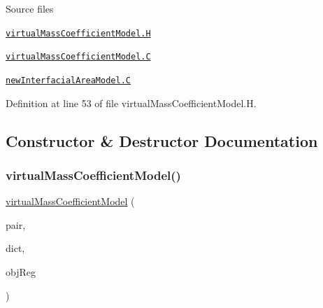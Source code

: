 \begin{DoxyParagraph}{Source files}

\begin{DoxyItemize}
\item \href{../../../home/carlo/data/GeN-Foam/GeN-Foam_ffn/GeN-Foam/GeN-Foam/classes/thermalHydraulics/src/physicsModels/virtualMassModels/virtualMassCoefficientModels/virtualMassCoefficientModel.H}{\tt virtual\+Mass\+Coefficient\+Model.\+H} 
\item \href{../../../home/carlo/data/GeN-Foam/GeN-Foam_ffn/GeN-Foam/GeN-Foam/classes/thermalHydraulics/src/physicsModels/virtualMassModels/virtualMassCoefficientModels/virtualMassCoefficientModel.C}{\tt virtual\+Mass\+Coefficient\+Model.\+C} 
\item \href{../../../home/carlo/data/GeN-Foam/GeN-Foam_ffn/GeN-Foam/GeN-Foam/classes/thermalHydraulics/src/physicsModels/virtualMassModels/virtualMassCoefficientModels/newInterfacialAreaModel.C}{\tt new\+Interfacial\+Area\+Model.\+C} 
\end{DoxyItemize}
\end{DoxyParagraph}


Definition at line 53 of file virtual\+Mass\+Coefficient\+Model.\+H.



\subsection{Constructor \& Destructor Documentation}
\mbox{\label{classFoam_1_1virtualMassCoefficientModel_a9cba82ef48369643a0bec036b6adfaec}} 
\subsubsection{\texorpdfstring{virtual\+Mass\+Coefficient\+Model()}{virtualMassCoefficientModel()}}
{\footnotesize\ttfamily \hyperlink{classFoam_1_1virtualMassCoefficientModel}{virtual\+Mass\+Coefficient\+Model} (\begin{DoxyParamCaption}\item[{const \hyperlink{classFoam_1_1FFPair}{F\+F\+Pair} \&}]{pair,  }\item[{const dictionary \&}]{dict,  }\item[{const object\+Registry \&}]{obj\+Reg }\end{DoxyParamCaption})}




